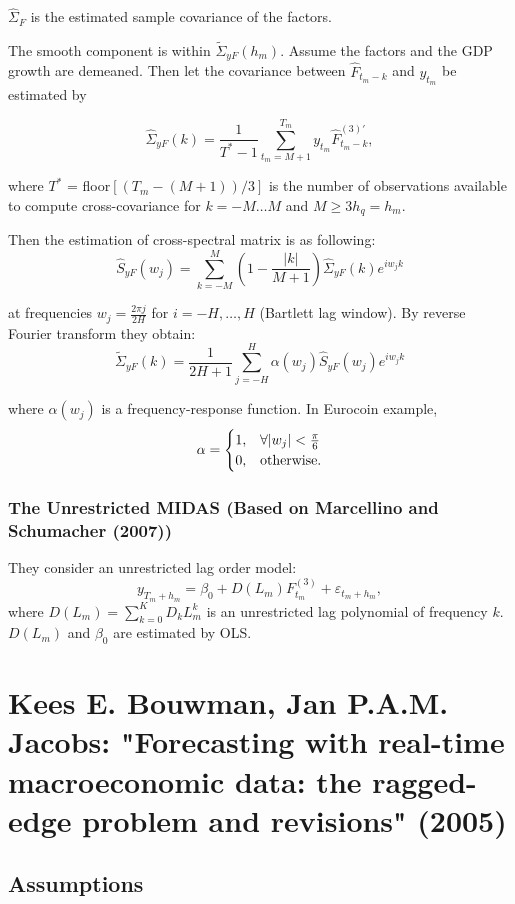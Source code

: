 \documentclass[8pt, a4paper, twocolumn, landscape]{extarticle}
\begin{document}
	$\hat{\Sigma}_F$ is the estimated sample covariance of the factors.
	\medskip
	
	The smooth component is within $\tilde{\Sigma}_{yF}(h_m)$. Assume the factors and the GDP growth are demeaned. Then let the covariance between $\hat{F}_{t_m-k}$ and $y_{t_m}$ be estimated by
	
	\[
	\hat{\Sigma}_{yF}(k) = \frac{1}{T^* - 1}\sum_{t_m = M + 1}^{T_m} y_{t_m} \hat{F}_{t_m - k}^{(3)'},
	\]
	
	where $T^*$ = floor$[(T_m - (M+1))/3]$ is the number of observations available to compute cross-covariance for $k = -M \dots M$ and $M \ge 3h_q = h_m$.
	
	Then the estimation of cross-spectral matrix is as following:
	\[
	\hat{S}_{yF}(w_j) = \sum_{k = -M}^{M} \left( 1 - \frac{|k|}{M + 1} \right) \hat{\Sigma}_{yF}(k)e^{iw_jk}
	\]
	
	at frequencies $w_j = \frac{2\pi j}{2H}$ for $i = -H, \dots, H$ (Bartlett lag window). By reverse Fourier transform they obtain:
	\[
	\tilde{\Sigma}_{yF}(k) = \frac{1}{2H + 1} \sum_{j = -H}^{H} \alpha (w_j) \hat{S}_{yF}(w_j)e^{iw_jk}
	\]
	
	where $\alpha(w_j)$ is a frequency-response function. In Eurocoin example,
	\[
	\alpha = \begin{cases}
	1, & \forall |w_j| < \frac{\pi}{6} \\
	0, & \textnormal{otherwise}.
	\end{cases}
	\]
	
	\subsubsection{The Unrestricted MIDAS (Based on Marcellino and Schumacher (2007))}
	
	They consider an unrestricted lag order model:
	\[
	y_{T_m + h_m} = \beta_0 + D(L_m)F_{t_m}^{(3)} + \varepsilon_{t_m + h_m},
	\]
	where $D(L_m) = \sum_{k = 0}^{K}D_kL_m^k$ is an unrestricted lag polynomial of frequency $k$. $D(L_m)$ and $\beta_0$ are estimated by OLS.
	
	
	\section{Kees E. Bouwman, Jan P.A.M. Jacobs: "Forecasting with real-time macroeconomic data: the ragged-edge problem and revisions" (2005)}
	
	\subsection{Assumptions}
	
\end{document}
